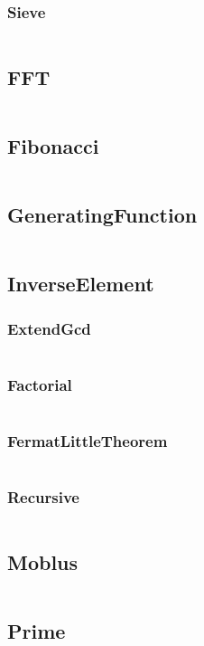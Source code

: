 \documentclass[a4paper,11pt]{article}
\begin{document}
\subsubsection{Sieve}
\inputminted[breaklines]{c++}{02++Math/+Euler/+Sieve.cpp}

\subsection{FFT}
\inputminted[breaklines]{c++}{02++Math/+FFT.cpp}
\subsection{Fibonacci}
\inputminted[breaklines]{c++}{02++Math/+Fibonacci.cpp}
\subsection{GeneratingFunction}
\inputminted[breaklines]{c++}{02++Math/+GeneratingFunction.cpp}
\subsection{InverseElement}
\subsubsection{ExtendGcd}
\inputminted[breaklines]{c++}{02++Math/+InverseElement/+ExtendGcd.cpp}
\subsubsection{Factorial}
\inputminted[breaklines]{c++}{02++Math/+InverseElement/+Factorial.cpp}
\subsubsection{FermatLittleTheorem}
\inputminted[breaklines]{c++}{02++Math/+InverseElement/+FermatLittleTheorem.cpp}
\subsubsection{Recursive}
\inputminted[breaklines]{c++}{02++Math/+InverseElement/+Recursive.cpp}

\subsection{Moblus}
\inputminted[breaklines]{c++}{02++Math/+Moblus.cpp}
\subsection{Prime}
\end{document}
